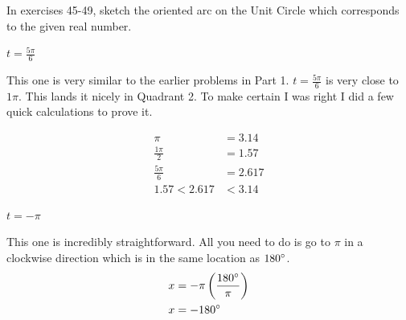 \documentclass[10pt,letterpaper]{amspset}
\begin{document}

In exercises 45-49, sketch the oriented arc on the Unit Circle which corresponds to the given real number.

\begin{problem} [45.]
$t = \frac{5\pi}{6}$
\end{problem}

\begin{solution}
This one is very similar to the earlier problems in Part 1. $t= \frac{5\pi}{6}$ is very close to $1\pi$. This lands it nicely in Quadrant 2. To make certain I was right I did a few quick calculations to prove it.

\begin{align}
    \pi &= 3.14 \\
    \frac{1\pi}{2} &= 1.57 \\
    \frac{5\pi}{6} &= 2.617 \\
    1.57 < 2.617 &< 3.14
\end{align} 

\begin{center}
\end{center}
\end{solution}


\begin{problem} [46.]
$t = -\pi$
\end{problem}

\begin{solution}
This one is incredibly straightforward. All you need to do is go to $\pi$ in a clockwise direction which is in the same location as $180\degree$.
\begin{align}
    x &= -\pi \left(\frac{180\degree}{\pi}\right) \\
    x &= -180\degree
\end{align}

\begin{center}
\end{center}
\end{solution}
\end{document}
